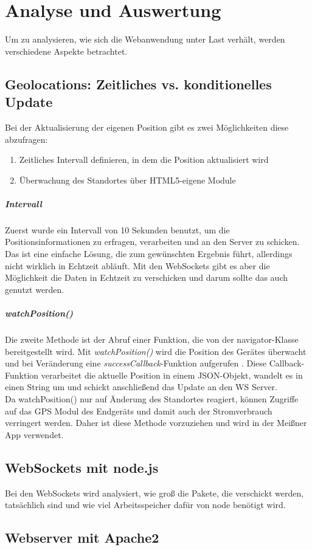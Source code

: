 \chapter{Analyse und Auswertung}
Um zu analysieren, wie sich die Webanwendung unter Last verhält, werden verschiedene Aspekte betrachtet.

\section{Geolocations: Zeitliches vs. konditionelles Update}
Bei der Aktualisierung der eigenen Position gibt es zwei Möglichkeiten diese abzufragen:

\begin{enumerate}
	\item Zeitliches Intervall definieren, in dem die Position aktualisiert wird
	\item Überwachung des Standortes über HTML5-eigene Module
\end{enumerate}

\paragraph{Intervall}
Zuerst wurde ein Intervall von 10 Sekunden benutzt, um die Positionsinformationen zu erfragen, verarbeiten und an den Server zu schicken. Das ist eine einfache Lösung, die zum gewünschten Ergebnis führt, allerdings nicht wirklich in Echtzeit abläuft. Mit den WebSockets gibt es aber die Möglichkeit die Daten in Echtzeit zu verschicken und darum sollte das auch genutzt werden.

\paragraph{watchPosition()}
Die zweite Methode ist der Abruf einer Funktion, die von der navigator-Klasse bereitgestellt wird. Mit \emph{watchPosition()} wird die Position des Gerätes überwacht und bei Veränderung eine \emph{successCallback}-Funktion aufgerufen \cite{geolocationapi}. Diese Callback-Funktion verarbeitet die aktuelle Position in einem JSON-Objekt, wandelt es in einen String um und schickt anschließend das Update an den WS Server.\\
Da watchPosition() nur auf Änderung des Standortes reagiert, können Zugriffe auf das GPS Modul des Endgeräts und damit auch der Stromverbrauch verringert werden. Daher ist diese Methode vorzuziehen und wird in der Meißner App verwendet.

\section{WebSockets mit node.js}
Bei den WebSockets wird analysiert, wie groß die Pakete, die verschickt werden, tatsächlich sind und wie viel Arbeitsspeicher dafür von node benötigt wird.

\section{Webserver mit Apache2}